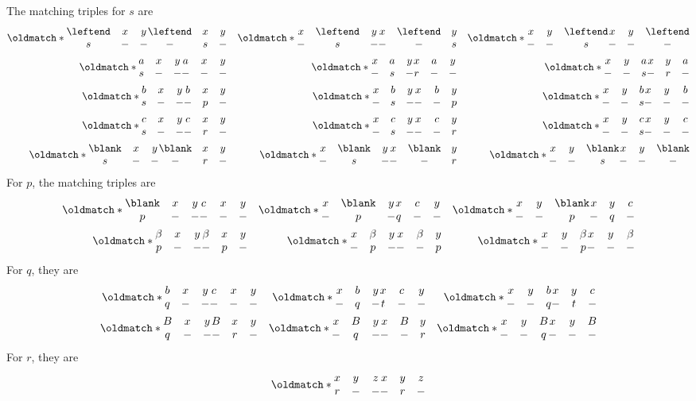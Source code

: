 \documentclass[12pt]{article}
\def\match{\oldmatch*}
\newcommand{\triple}[6]{%
    \begin{matrix}
        #1 & #2 & #3 \\
        #4 & #5 & #6 \\
    \end{matrix}%
}
\begin{document}
\begin{solution}
\begin{enumerate}[label=(\alph*)]
        The matching triples for $s$ are \small \begin{align*}
            \match{\triple \leftend x y s--}{\triple \leftend x y -s-}
            && \match{\triple x \leftend y -s-}{\triple x \leftend y --s}
            && \match{\triple x y \leftend --s}{\triple x y \leftend ---} \\
            \match{\triple a x y s--}{\triple a x y ---}
            && \match{\triple x a y -s-}{\triple x a y r--}
            && \match{\triple x y a --s}{\triple x y a -r-} \\
            \match{\triple b x y s--}{\triple b x y -p-}
            && \match{\triple x b y -s-}{\triple x b y --p}
            && \match{\triple x y b --s}{\triple x y b ---} \\
            \match{\triple c x y s--}{\triple c x y -r-}
            && \match{\triple x c y -s-}{\triple x c y --r}
            && \match{\triple x y c --s}{\triple x y c ---} \\
            \match{\triple \blank x y s--}{\triple \blank x y -r-}
            && \match{\triple x \blank y -s-}{\triple x \blank y --r}
            && \match{\triple x y \blank --s}{\triple x y \blank ---}
        \end{align*} \normalsize
        For $p$, the matching triples are \small \begin{align*}
            \match{\triple \blank x y p--}{\triple c x y ---}
            && \match{\triple x \blank y -p-}{\triple x c y q--}
            && \match{\triple x y \blank --p}{\triple x y c -q-} \\
            \match{\triple \beta x y p--}{\triple \beta x y -p-}
            && \match{\triple x \beta y -p-}{\triple x \beta y --p}
            && \match{\triple x y \beta --p}{\triple x y \beta ---}
        \end{align*} \normalsize
        For $q$, they are \small \begin{align*}
            \match{\triple b x y q--}{\triple c x y ---}
            && \match{\triple x b y -q-}{\triple x c y t--}
            && \match{\triple x y b --q}{\triple x y c -t-} \\
            \match{\triple B x y q--}{\triple B x y -r-}
            && \match{\triple x B y -q-}{\triple x B y --r}
            && \match{\triple x y B --q}{\triple x y B ---}
        \end{align*} \normalsize
        For $r$, they are \small \begin{align*}
            \match{\triple x y z r--}{\triple x y z -r-}

\end{align*}
\end{enumerate}
\end{solution}
\end{document}
